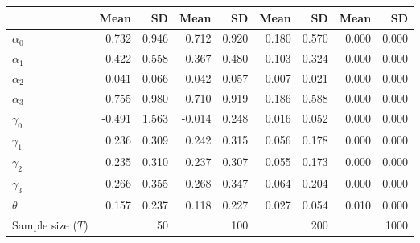 
\begin{tabular}[t]{lrrrrrrrr}
\toprule
  & Mean & SD & Mean  & SD  & Mean   & SD   & Mean    & SD   \\
\midrule
$\alpha_{0}$ & 0.732 & 0.946 & 0.712 & 0.920 & 0.180 & 0.570 & 0.000 & 0.000\\
$\alpha_{1}$ & 0.422 & 0.558 & 0.367 & 0.480 & 0.103 & 0.324 & 0.000 & 0.000\\
$\alpha_{2}$ & 0.041 & 0.066 & 0.042 & 0.057 & 0.007 & 0.021 & 0.000 & 0.000\\
$\alpha_{3}$ & 0.755 & 0.980 & 0.710 & 0.919 & 0.186 & 0.588 & 0.000 & 0.000\\
$\gamma_{0}$ & -0.491 & 1.563 & -0.014 & 0.248 & 0.016 & 0.052 & 0.000 & 0.000\\
$\gamma_{1}$ & 0.236 & 0.309 & 0.242 & 0.315 & 0.056 & 0.178 & 0.000 & 0.000\\
$\gamma_{2}$ & 0.235 & 0.310 & 0.237 & 0.307 & 0.055 & 0.173 & 0.000 & 0.000\\
$\gamma_{3}$ & 0.266 & 0.355 & 0.268 & 0.347 & 0.064 & 0.204 & 0.000 & 0.000\\
$\theta$ & 0.157 & 0.237 & 0.118 & 0.227 & 0.027 & 0.054 & 0.010 & 0.000\\
Sample size ($T$) &  & 50 &  & 100 &  & 200 &  & 1000\\
\bottomrule
\end{tabular}
